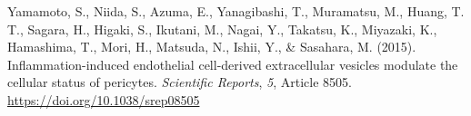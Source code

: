 \documentclass[authordate, empirical]{jote-new-article}
\begin{document}
	Yamamoto, S., Niida, S., Azuma, E., Yanagibashi, T., Muramatsu, M., Huang, T. T., Sagara, H., Higaki, S., Ikutani, M., Nagai, Y., Takatsu, K., Miyazaki, K., Hamashima, T., Mori, H., Matsuda, N., Ishii, Y., \& Sasahara, M. (2015). Inflammation-induced endothelial cell-derived extracellular vesicles modulate the cellular status of pericytes. \emph{Scientific Reports},\emph{ 5}, Article 8505. \url{https://doi.org/10.1038/srep08505}
\end{document}
